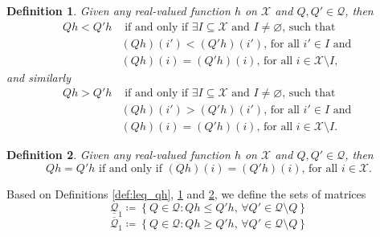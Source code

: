 \documentclass{article}
\newcommand{\statessymbol}{\mathcal{X}}
\newcommand{\matrices}{\mathcal{Q}}
\newcommand{\lmatrixi}[1]{\underline{\matrices}_{#1}}
\newcommand{\umatrixi}[1]{\overline{\matrices}_{#1}}
\newcommand{\stateset}{\statessymbol}
\newtheorem{Definition}{Definition}
\begin{document}
\begin{Definition} \label{def:l_qh}
Given any real-valued function $h$ on $\stateset$ and $ Q, Q' \in \matrices$, then 
\begin{equation*} 
\begin{split}
 Q h< Q'h &\text{ if and only if } \exists I\subseteq\stateset\text{ and }I\neq\varnothing \text{, such that }\\ 
& (Qh)(i')<  (Q'h)(i') \text{, for all } i'\in I \text{ and }\\
 & (Qh)(i)=  (Q'h)(i) \text{, for all } i\in\stateset\setminus I,
\end{split}
\end{equation*}
and similarly 
\begin{equation*} 
\begin{split}
 Qh> Q'h &\text{ if and only if } \exists I\subseteq\stateset\text{ and }I\neq\varnothing \text{, such that }\\ 
& (Q h)(i')>  (Q'h)(i') \text{, for all } i'\in I \text{ and }\\
& (Q h)(i)=  (Q'h)(i) \text{, for all } i\in\stateset\setminus I.
\end{split}
\end{equation*}
\end{Definition}
\begin{Definition} \label{def:eq_qh}
Given any real-valued function $h$ on $\stateset$ and $ Q, Q' \in \matrices$, then 
\begin{equation*}
 Q h= Q'h \text{ if and only if }  (Q h)(i)=  (Q'h)(i) \text{, for all } i\in\stateset.
\end{equation*}
\end{Definition}

\noindent
Based on Definitions \ref{def:leq_qh}, \ref{def:l_qh} and \ref{def:eq_qh}, we define the sets of matrices 
\begin{equation} \label{eq:lset1}
\lmatrixi{1}\coloneqq\left\{Q\in\matrices:Qh\leq Q'h\text{, }\forall Q'\in\matrices\setminus Q\right\} 
\end{equation} 
\begin{equation*}
\umatrixi{1}\coloneqq\left\{Q\in\matrices:Qh\geq Q'h\text{, }\forall Q'\in\matrices\setminus Q\right\}
\end{equation*} 
\end{document}
